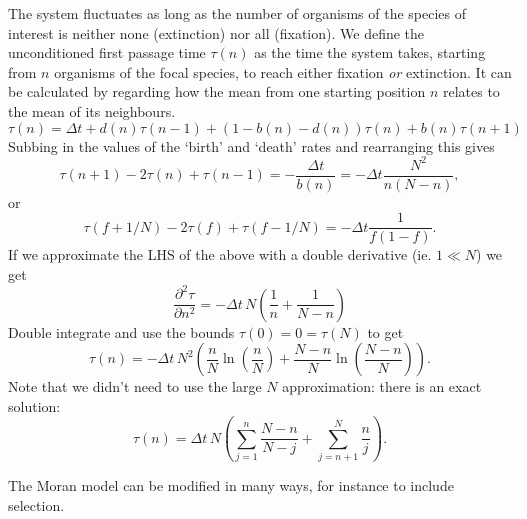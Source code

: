 \documentclass[a4paper,11pt]{article}
\numberwithin{equation}{section} %
\begin{document}
The system fluctuates as long as the number of organisms of the species of interest is neither none (extinction) nor all (fixation). 
We define the unconditioned first passage time $\tau(n)$ as the time the system takes, starting from $n$ organisms of the focal species, to reach either fixation \emph{or} extinction. 
It can be calculated by regarding how the mean from one starting position $n$ relates to the mean of its neighbours. 
\begin{equation}
\tau(n) = \Delta t + d(n)\tau(n-1) + \left(1-b(n)-d(n)\right)\tau(n) + b(n)\tau(n+1)
\end{equation}
Subbing in the values of the `birth' and `death' rates and rearranging this gives
\begin{equation}
\tau(n+1) - 2\tau(n) + \tau(n-1) = -\frac{\Delta t}{b(n)} = -\Delta t\frac{N^2}{n(N-n)},
\end{equation}
or
\begin{equation}
\tau(f+1/N) - 2\tau(f) + \tau(f-1/N) = -\Delta t\frac{1}{f(1-f)}. 
\end{equation}
If we approximate the LHS of the above with a double derivative (ie. $1\ll N$) we get
\begin{equation}
\frac{\partial^2\tau}{\partial n^2} = -\Delta t\,N\left(\frac{1}{n}+\frac{1}{N-n}\right)
\end{equation}
Double integrate and use the bounds $\tau(0) = 0 = \tau(N)$ to get
\begin{equation}
\tau(n) = -\Delta t\,N^2\left(\frac{n}{N}\ln\left(\frac{n}{N}\right)+\frac{N-n}{N}\ln\left(\frac{N-n}{N}\right)\right). 
\end{equation}
Note that we didn't need to use the large $N$ approximation: there is an exact solution:
\begin{equation}
\tau(n) = \Delta t\,N\left(\sum_{j=1}^n\frac{N-n}{N-j} + \sum_{j=n+1}^N\frac{n}{j}\right). 
\end{equation}
\begin{figure}
	\centering
\end{figure}
The Moran model can be modified in many ways, for instance to include selection. 
\end{document}
